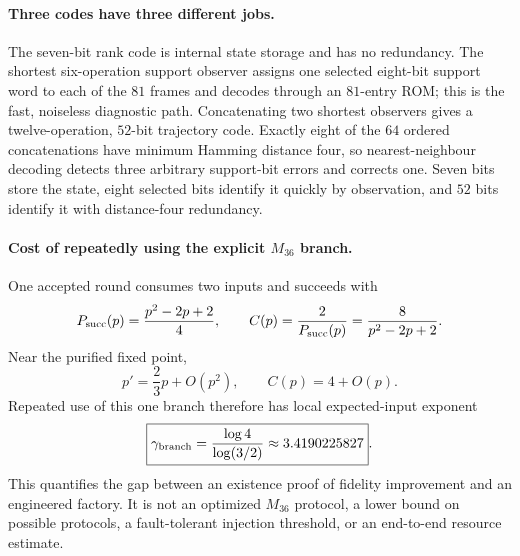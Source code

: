 \paragraph{Three codes have three different jobs.}
The seven-bit rank code is internal state storage and has no redundancy.  The shortest
six-operation support observer assigns one selected eight-bit support word to each of the
$81$ frames and decodes through an $81$-entry ROM; this is the fast, noiseless diagnostic
path.  Concatenating two shortest observers gives a twelve-operation, $52$-bit trajectory
code.  Exactly eight of the $64$ ordered concatenations have minimum Hamming distance
four, so nearest-neighbour decoding detects three arbitrary support-bit errors and
corrects one.  Seven bits store the state, eight selected bits identify it quickly by
observation, and $52$ bits identify it with distance-four redundancy.

\paragraph{Cost of repeatedly using the explicit $M_{36}$ branch.}
One accepted round consumes two inputs and succeeds with
\[
  P_{\rm succ}(p)=\frac{p^2-2p+2}{4},
  \qquad
  C(p)=\frac{2}{P_{\rm succ}(p)}=\frac{8}{p^2-2p+2}.
\]
Near the purified fixed point,
\[
  p'=\frac23p+O(p^2),\qquad C(p)=4+O(p).
\]
Repeated use of this one branch therefore has local expected-input exponent
\[
  \boxed{\gamma_{\rm branch}=\frac{\log4}{\log(3/2)}
  \approx3.4190225827}.
\]
This quantifies the gap between an existence proof of fidelity improvement and an
engineered factory.  It is not an optimized $M_{36}$ protocol, a lower bound on possible
protocols, a fault-tolerant injection threshold, or an end-to-end resource estimate.
